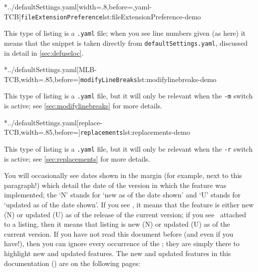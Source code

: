 	\begin{minipage}{.4\textwidth}
		\cmhlistingsfromfile[style=fileExtensionPreference]*{../defaultSettings.yaml}[width=.8\linewidth,before=\centering,yaml-TCB]{\texttt{fileExtensionPreference}}{lst:fileExtensionPreference-demo}
	\end{minipage}%
	\hfill
	\begin{minipage}{.4\textwidth}
		This type of listing is a \texttt{.yaml} file; when you see line numbers given (as here)
		it means that the snippet is taken directly from \texttt{defaultSettings.yaml}, discussed in
		detail in \vref{sec:defuseloc}.
	\end{minipage}%

	\begin{minipage}{.55\textwidth}
		\cmhlistingsfromfile[style=modifylinebreaks]*{../defaultSettings.yaml}[MLB-TCB,width=.85\linewidth,before=\centering]{\texttt{modifyLineBreaks}}{lst:modifylinebreaks-demo}
	\end{minipage}%
	\hfill
	\begin{minipage}{.4\textwidth}
		This type of listing is a \texttt{.yaml} file, but it will only
		be relevant when the \texttt{-m} switch is active; see \vref{sec:modifylinebreaks}
		for more details.
	\end{minipage}%

	\begin{minipage}{.55\textwidth}
		\cmhlistingsfromfile*[style=replacements]*{../defaultSettings.yaml}[replace-TCB,width=.85\linewidth,before=\centering]{\texttt{replacements}}{lst:replacements-demo}
	\end{minipage}%
	\hfill
	\begin{minipage}{.4\textwidth}
		This type of listing is a \texttt{.yaml} file, but it will only
		be relevant when the \texttt{-r} switch is active; see \vref{sec:replacements}
		for more details.
	\end{minipage}%

	You will occasionally see dates shown in the margin (for example, next to this
	paragraph!)%
	 which detail the date
	of the version in which the feature was implemented; the `N' stands for `new as of the
	date shown' and `U' stands for `updated as of the date shown'. If you see \stardemo, it
	means that the feature is either new (N) or updated (U) as of the release of the current
	version; if you see \stardemo\, attached to a listing, then it means that listing is new
	(N) or updated (U) as of the current version. If you have not read this document before
	(and even if you have!), then you can ignore every occurrence of the \stardemo; they are
	simply there to highlight new and updated features. The new and updated features in this
	documentation (\gitRel) are on the following pages: \listOfNewFeatures

